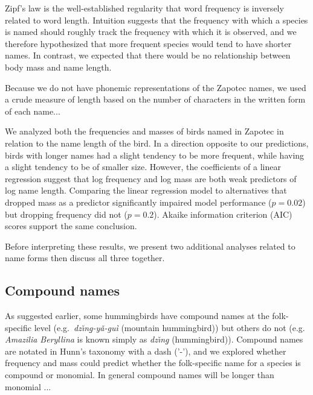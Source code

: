 \documentclass[10pt,letterpaper]{article}
\begin{document}
Zipf's law \cite{zipf1936psycho,zipf1949human} is the well-established regularity that word frequency is inversely related to word length. Intuition suggests that the frequency with which a species is named should roughly track the frequency with which it is observed, and we therefore hypothesized that more frequent species would tend to have shorter names.  In contrast, we expected that there would be no relationship between body mass and name length. 

Because we do not have phonemic representations of the Zapotec names, we used a crude measure of length based on the number of characters in the written form of each name...

We analyzed both the frequencies and masses of birds named in Zapotec in relation to the name length of the bird. In a direction opposite to our predictions, birds with longer names had a slight tendency to be more frequent, while having a slight tendency to be of smaller size. However, the coefficients of a linear regression suggest that log frequency and log mass are both weak predictors of log name length. Comparing the linear regression model to alternatives that dropped mass as a predictor significantly impaired model performance ($p = 0.02$) but dropping frequency did not ($p = 0.2$). Akaike information criterion (AIC) scores support the same conclusion.


Before interpreting these results, we present two additional analyses related to name forms then discuss all three together.

\subsection{Compound names}

As suggested earlier, some hummingbirds have compound names at the folk-specific level (e.g.\ \textit{dz\v{\i}n\b{g}-y\v{a}-gu\`{i}} (mountain hummingbird)) but others do not (e.g.\   
\emph{ Amazilia Beryllina} is known simply as \textit{dz\v{\i}n\b{g}} (hummingbird)). Compound names are notated in Hunn's taxonomy with a dash ('-'), and we explored whether frequency and mass could predict whether the folk-specific name for a species is compound or monomial. In general compound names will be longer than monomial ...
\end{document}
